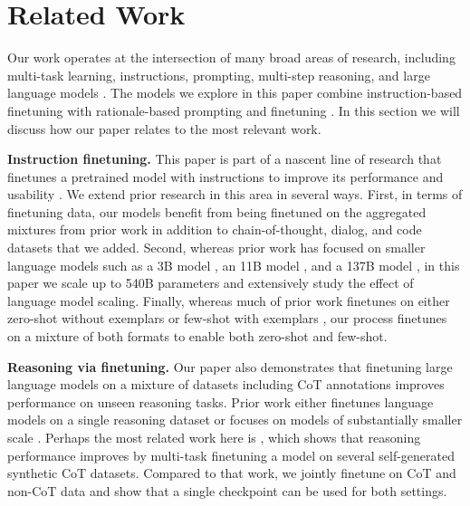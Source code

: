 \section{Related Work}

Our work operates at the intersection of many broad areas of research, including multi-task learning, instructions, prompting, multi-step reasoning, and large language models \citep[][\textit{inter alia}]{radford2019language,brown2020language,aghajanyan-etal-2021-muppet,chowdhery2022palm,lewkowycz2022solving}. The models we explore in this paper combine instruction-based finetuning \citep{wei2021finetuned,sanh2021multitask,ouyang2022training,min-etal-2022-metaicl} with rationale-based prompting and finetuning \citep[][\textit{inter alia}]{ling-etal-2017-program,cobbe2021training,wei2022chain}. In this section we will discuss how our paper relates to the most relevant work.

\textbf{Instruction finetuning.} This paper is part of a nascent line of research that finetunes a pretrained model with instructions to improve its performance and usability \citep[][\textit{inter alia}]{wei2021finetuned,sanh2021multitask,ouyang2022training}. We extend prior research in this area in several ways. First, in terms of finetuning data, our models benefit from being finetuned on the aggregated mixtures from prior work  \citep{wang2022benchmarking,sanh2021multitask,wei2021finetuned} in addition to chain-of-thought, dialog, and code datasets that we added. Second, whereas prior work has focused on smaller language models such as a 3B model \citep{wang2022benchmarking}, an 11B model \citep{sanh2021multitask}, and a 137B model \citep{wei2021finetuned}, in this paper we scale up to 540B parameters and extensively study the effect of language model scaling. Finally, whereas much of prior work finetunes on either zero-shot without exemplars \citep{zhong2021meta,wei2021finetuned,sanh2021multitask,wang2022language} or few-shot with exemplars \citep{ye2021crossfit,wei2021finetuned,mishra2021cross,min-etal-2022-metaicl,wang2022benchmarking}, our process finetunes on a mixture of both formats to enable both zero-shot and few-shot.

\textbf{Reasoning via finetuning.} Our paper also demonstrates that finetuning large language models on a mixture of datasets including CoT annotations improves performance on unseen reasoning tasks. Prior work either finetunes language models on a single reasoning dataset \citep[][\textit{inter alia}]{ling-etal-2017-program,camburu2018snli,cobbe2021training,nye2021show,zelikman2022star} or focuses on models of substantially smaller scale \citep{ling-etal-2017-program,camburu2018snli,rajani-etal-2019-explain,talmor2020leap,zelikman2022star}. Perhaps the most related work here is \citet{huang2023selfimprove}, which shows that reasoning performance improves by multi-task finetuning a model on several self-generated synthetic CoT datasets. Compared to that work, we jointly finetune on CoT and non-CoT data and show that a single checkpoint can be used for both settings.

